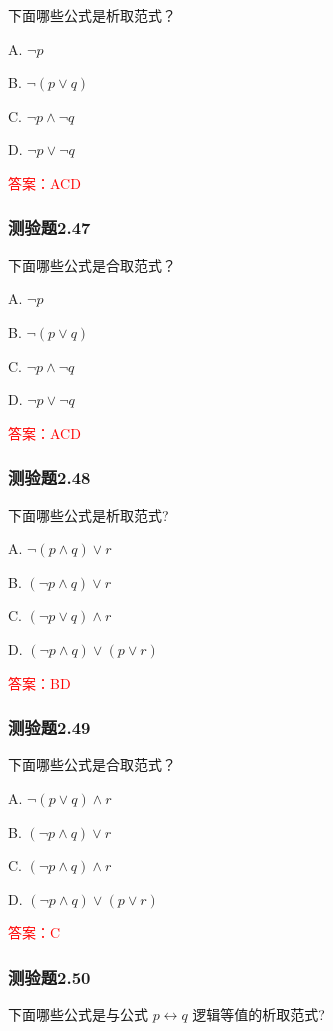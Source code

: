 \documentclass[UTF8, heading=true]{ctexart}
\begin{document}
下面哪些公式是析取范式？

A. $ \neg p$

B. $\neg(p \vee q)$

C. $\neg p \wedge \neg q$

D. $ \neg p \vee \neg q$

\textcolor{red}{答案：ACD}

\subsubsection{测验题2.47}

下面哪些公式是合取范式？

A. $ \neg p$

B. $\neg(p \vee q)$

C. $\neg p \wedge \neg q$

D. $ \neg p \vee \neg q$

\textcolor{red}{答案：ACD}

\subsubsection{测验题2.48}

下面哪些公式是析取范式?

A. $\neg(p \wedge q) \vee r$

B. $(\neg p \wedge q) \vee r$

C. $(\neg p \vee q) \wedge r$

D. $(\neg p \wedge q) \vee(p \vee r)$

\textcolor{red}{答案：BD}


\subsubsection{测验题2.49}

下面哪些公式是合取范式？

A. $ \neg(p \vee q) \wedge r$

B. $(\neg p \wedge q) \vee r$

C. $(\neg p \wedge q) \wedge r$

D. $(\neg p \wedge q) \vee(p \vee r)$

\textcolor{red}{答案：C}

\subsubsection{测验题2.50}

下面哪些公式是与公式 $p \leftrightarrow q$ 逻辑等值的析取范式?
\end{document}
